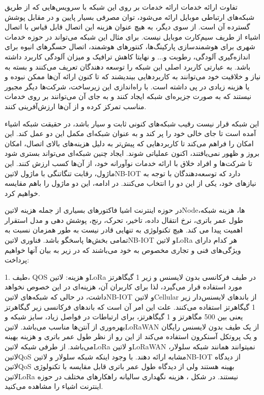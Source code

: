 تفاوت ارائه خدمات ارائه خدمات بر روی این شبکه با سرویس‌هایی که از طریق شبکه‌های ارتباطی موبایل ارائه می‌شود، توان مصرفی بسیار پایین و در مقابل پوشش گسترده آن است. از سوی دیگر، به هیچ عنوان هزینه این اتصال قابل قیاس با اتصال اشیاء از طریف سیم‌کارت موبایل نیست. برای مثال این شبکه می‌تواند در حوزه خدمات شهری برای هوشمندسازی پارکینگ‌ها، کنتورهای هوشمند، اتصال حسگرهای انبوه برای اندازه‌گیری آلودگی، رطوبت و... و نهایتا کاهش ترافیک و میزان آلودگی کاربرد داشته باشد. به عبارتی کاربرد اصلی این شبکه را توسعه دهندگان تعریف می‌کنند و بسته به نیاز و خلاقیت خود می‌توانند به کاربردهایی بیندیشند که تا کنون ارائه آن‌ها ممکن نبوده و یا هزینه زیادی در پی داشته است. با راه‌اندازی این زیرساخت، شرکت‌ها دیگر مجبور نیستند که به صورت جزیره‌ای شبکه ایجاد کنند و به جای آن می‌توانند بر روی خدمات مناسب تمرکز کرده و از آن‌ها ارزش‌آفرینی کنند.

این شبکه قرار نیست رقیب شبکه‌های کنونی ثابت و سیار باشد، در حقیقت شبکه اشیاء آمده است تا جای خالی خود را پر کند و به عنوان شبکه‌ای مکمل این دو عمل کند. این امکان را فراهم می‌کند تا کاربردهایی که پیش‌تر به دلیل هزینه‌های بالای اتصال، امکان بروز و ظهور نمی‌یافتند، اکنون عملیاتی شوند.  ایجاد چنین شبکه‌ای می‌تواند بستری شود تا شرکت‌ها و افراد خلاق با ارائه خدمات نوآورانه خود، از آن‌ها کسب ارزش کنند. این ماژول، رقابت تنگاتنگی با ماژول ‌لاتین{NB-IOT} دارد که توسعه‌دهندگان با توجه به نیاز‌های خود، یکی از این دو را انتخاب می‌کنند. در ادامه، این دو ماژول را باهم مقایسه خواهیم کرد.


در حوزه اینترنت اشیا فاکتورهای بسیاری از جمله هزینه ‌لاتین{Node}ها، هزینه شبکه، طول عمر باتری، نرخ انتقال داده، تاخیر، تحرک، رنج، پوشش دهی و مدل استقرار اهمیت پیدا می کند. هیچ تکنولوژی به تنهایی قادر نیست به طور همزمان نسبت به تمامی بخش‌ها پاسخگو باشد. فناوری ‌لاتین{NB-IOT} و ‌لاتین{LoRa} هر کدام دارای ویژگی‌های فنی و تجاری مخصوص به خود می‌باشند که در زیر به بیان آنها خواهیم پرداخت:

1. طیف، QOS و هزینه: ‌لاتین{LoRa} در طیف فرکانسی بدون لایسنس و زیر 1 گیگاهرتز مورد استفاده قرار می‌گیرد، لذا برای کاربران آن، هزینه‌ای در این خصوص نخواهد داشت، در حالی که شبکه‌های ‌لاتین{NB-IOT} و ‌لاتین{Cellular} از باندهای لایسنس‌دار زیر 1 گیگاهرتز استفاده می‌کنند. علت این امر آن است که باندهای فرکانسی زیر گیگاهرتز یعنی بین 500 مگاهرتز و 1 گیگاهرتز، برای ارتباطات در فواصل زیاد، سایز شبکه و بهره‌وری از آنتن‌ها مناسب می‌باشد. ‌لاتین{LoRaWAN} از یک طیف بدون لایسنس رایگان و یک پروتکل آسنکرون استفاده می‌کند از این رو از نظر طول عمر باتری و هزینه بهینه می‌باشد. از طرفی شبکه ‌لاتین{LoRa} و ‌لاتین{LoRaWAN} نمیتوانند همانند شبکه سلولار، ‌لاتین{QoS} مشابه ارائه دهند. با وجود اینکه شبکه سلولار و ‌لاتین{NB-IOT} از دیدگاه ‌لاتین{QoS} بهینه هستند ولی از دیدگاه طول عمر باتری قابل مقایسه با تکنولوژی ‌لاتین{LoRa} نیستند. در شکل ، هزینه نگهداری سالیانه راهکارهای مختلف در حوزه اینترنت اشیاء را مشاهده می‌کنید.

